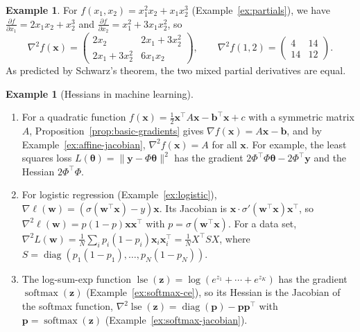 \documentclass[11pt]{article}
\newcommand{\norm}[1]{\lVert #1 \rVert}
\theoremstyle{definition}
\newtheorem{example}[definition]{Example}
\theoremstyle{plain}
\theoremstyle{remark}
\DeclareMathOperator{\diag}{diag}
\DeclareMathOperator{\softmax}{softmax}
\begin{document}
\begin{example}\label{ex:hessian}
    For $f(x_1, x_2) = x_1^2 x_2 + x_1 x_2^3$ (Example~\ref{ex:partials}), we have $\frac{\partial f}{\partial x_1} = 2x_1x_2 + x_2^3$ and $\frac{\partial f}{\partial x_2} = x_1^2 + 3x_1x_2^2$, so
    \[\nabla^2 f(\mathbf{x}) = \begin{pmatrix} 2x_2 & 2x_1 + 3x_2^2 \\ 2x_1 + 3x_2^2 & 6x_1x_2 \end{pmatrix}, \qquad \nabla^2 f(1, 2) = \begin{pmatrix} 4 & 14 \\ 14 & 12 \end{pmatrix}.\]
    As predicted by Schwarz's theorem, the two mixed partial derivatives are equal.
\end{example}

\begin{example}[Hessians in machine learning]\label{ex:ml-hessians}
    \begin{enumerate}
        \item For a quadratic function $f(\mathbf{x}) = \frac{1}{2}\mathbf{x}^\top A\mathbf{x} - \mathbf{b}^\top\mathbf{x} + c$ with a symmetric matrix $A$, Proposition~\ref{prop:basic-gradients} gives $\nabla f(\mathbf{x}) = A\mathbf{x} - \mathbf{b}$, and by Example~\ref{ex:affine-jacobian}, $\nabla^2 f(\mathbf{x}) = A$ for all $\mathbf{x}$. For example, the least squares loss $L(\boldsymbol{\theta}) = \norm{\mathbf{y} - \Phi\boldsymbol{\theta}}^2$ has the gradient $2\Phi^\top\Phi\boldsymbol{\theta} - 2\Phi^\top\mathbf{y}$ and the Hessian $2\Phi^\top\Phi$.
        \item For logistic regression (Example~\ref{ex:logistic}), $\nabla \ell(\mathbf{w}) = (\sigma(\mathbf{w}^\top\mathbf{x}) - y)\mathbf{x}$. Its Jacobian is $\mathbf{x} \cdot \sigma'(\mathbf{w}^\top\mathbf{x})\mathbf{x}^\top$, so $\nabla^2 \ell(\mathbf{w}) = p(1 - p)\mathbf{x}\mathbf{x}^\top$ with $p = \sigma(\mathbf{w}^\top\mathbf{x})$. For a data set, $\nabla^2 L(\mathbf{w}) = \frac{1}{N}\sum_i p_i(1 - p_i)\mathbf{x}_i\mathbf{x}_i^\top = \frac{1}{N} X^\top S X$, where $S = \diag(p_1(1 - p_1), \ldots, p_N(1 - p_N))$.
        \item The log-sum-exp function $\operatorname{lse}(\mathbf{z}) = \log(e^{z_1} + \cdots + e^{z_K})$ has the gradient $\softmax(\mathbf{z})$ (Example~\ref{ex:softmax-ce}), so its Hessian is the Jacobian of the softmax function, $\nabla^2 \operatorname{lse}(\mathbf{z}) = \diag(\mathbf{p}) - \mathbf{p}\mathbf{p}^\top$ with $\mathbf{p} = \softmax(\mathbf{z})$ (Example~\ref{ex:softmax-jacobian}).
    \end{enumerate}
\end{example}
\end{document}
